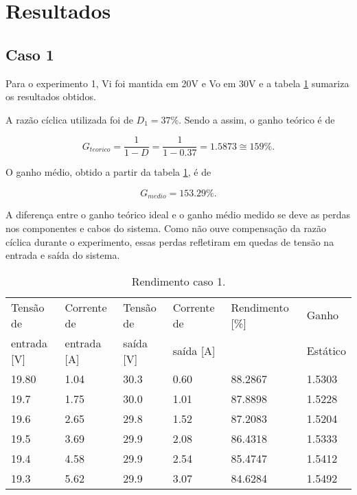 \newpage
\section{Resultados}

\subsection{Caso 1}

	Para o experimento 1, Vi foi mantida em 20V e Vo em 30V e a tabela \ref{t_rend1} sumariza os resultados obtidos.

	A razão cíclica utilizada foi de $D_1 = 37 \%$. Sendo a assim, o ganho teórico é de

	\[
		G_{teorico} = \frac{1}{1-D} = \frac{1}{1-0.37} = 1.5873 \cong 159 \%.
	\]

	O ganho médio, obtido a partir da tabela \ref{t_rend1}, é de
	
	\[
		G_{medio} = 153.29 \%.
	\]

	A diferença entre o ganho teórico ideal e o ganho médio medido se deve as perdas nos componentes e cabos do sistema. Como não ouve compensação da razão cíclica durante o experimento, essas perdas refletiram em quedas de tensão na entrada e saída do sistema.
	
	\begin{small}
		\begin{table}[H]
			\begin{center}
				\caption{Rendimento caso 1.}
				\begin{tabular}{l|l|l|l|l|l}
					\hline
					Tensão de   &  Corrente de 	& Tensão de & Corrente de	& Rendimento [\%] 	& Ganho    	\\
					entrada [V] &  entrada [A] 	& saída [V] & saída [A]  	&                 	& Estático 	\\
					\hline
					19.80 		& 1.04			& 30.3		& 0.60			& 88.2867			& 1.5303	\\
					\hline
					19.7		& 1.75			& 30.0		& 1.01			& 87.8898			& 1.5228	\\
					\hline
					19.6		& 2.65			& 29.8		& 1.52			& 87.2083			& 1.5204	\\
					\hline
					19.5		& 3.69			& 29.9		& 2.08			& 86.4318			& 1.5333	\\
					\hline
					19.4		& 4.58			& 29.9		& 2.54			& 85.4747			& 1.5412	\\
					\hline
					19.3		& 5.62			& 29.9		& 3.07			& 84.6284			& 1.5492	\\
				\end{tabular}
				\label{t_rend1}
			\end{center}
		\end{table}
	\end{small}

